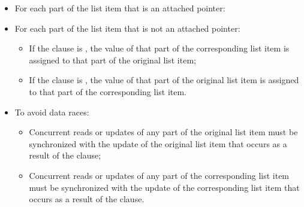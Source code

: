 \begin{itemize}
\item For each part of the list item that is an attached pointer:  

\begin{itemize}
\end{itemize}

\item For each part of the list item that is not an attached pointer: 

\begin{itemize}
\item If the clause is , the value of that part of the corresponding 
      list item is assigned to that part of the original list item;
\item If the clause is , the value of that part of the original list 
      item is assigned to that part of the corresponding list item.
\end{itemize}

\item To avoid data races: 

\begin{itemize}
\item Concurrent reads or updates of any part of the original list item must be 
      synchronized with the update of the original list item that occurs as a 
      result of the  clause;
\item Concurrent reads or updates of any part of the corresponding list item must 
      be synchronized with the update of the corresponding list item that occurs 
      as a result of the  clause.
\end{itemize}

\end{itemize}


